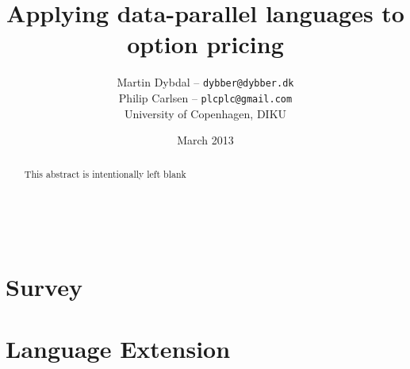 \documentclass[10pt,a4paper,final,openright]{memoir}
\title{Applying data-parallel languages to option pricing}
\author{
  Martin Dybdal -- \texttt{dybber@dybber.dk} \\
  Philip Carlsen -- \texttt{plcplc@gmail.com}
\\
University of Copenhagen, DIKU}
\date{March 2013}
\begin{document}
\frontmatter
\maketitle
\thispagestyle{empty}
\begin{abstract}
This abstract is intentionally left blank
\end{abstract}

\renewcommand*{\cftpartname}{Part\space}
\clearpage
~\thispagestyle{empty}
\clearpage
\tableofcontents*

\mainmatter
{}




\part{Survey}
\label{part:survey}






\part{Language Extension}
\label{part:extensions}



\clearpage

{}
\printbibliography

\appendix

\end{document}
